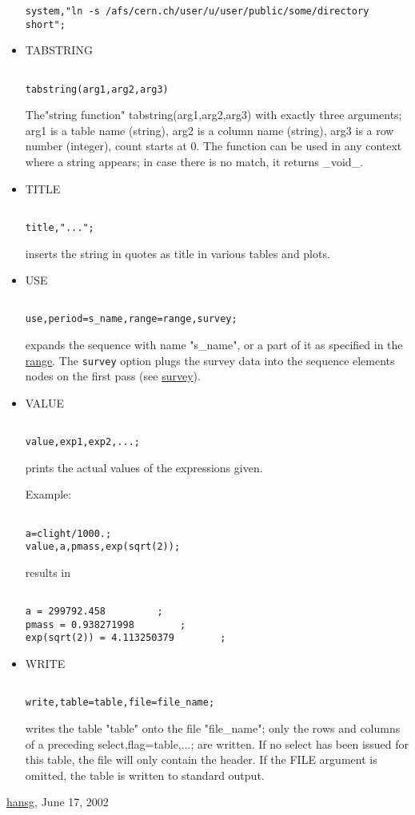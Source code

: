 \begin{itemize}
\begin{verbatim}
system,"ln -s /afs/cern.ch/user/u/user/public/some/directory short";
\end{verbatim}


	\item TABSTRING
\begin{verbatim}

tabstring(arg1,arg2,arg3)
\end{verbatim}  The"string function" tabstring(arg1,arg2,arg3) with exactly  three arguments; arg1 is a table name (string), arg2 is a column name  (string), arg3 is a row number (integer), count starts at 0. The function can be used in any context where a string appears; in case there is no match, it returns \_void\_. 


	\item TITLE
\begin{verbatim}

title,"...";
\end{verbatim} inserts the string in quotes as title in various tables and plots. 


	\item USE
\begin{verbatim}

use,period=s_name,range=range,survey;
\end{verbatim} expands the sequence with name "s\_name", or a part of it as specified in the \href{../Introduction/ranges.html#range}{range}. The \texttt{survey} option plugs the survey data into the sequence elements nodes on the first pass (see \href{../survey/survey.html}{survey}). 


	\item VALUE
\begin{verbatim}

value,exp1,exp2,...;
\end{verbatim} prints the actual values of the expressions given. 

 Example: 
\begin{verbatim}

a=clight/1000.;
value,a,pmass,exp(sqrt(2));
\end{verbatim} results in 
\begin{verbatim}

a = 299792.458         ;
pmass = 0.938271998        ;
exp(sqrt(2)) = 4.113250379        ;
\end{verbatim}


	\item WRITE
\begin{verbatim}

write,table=table,file=file_name;
\end{verbatim} writes the table "table" onto the file "file\_name"; only the rows and columns of a preceding select,flag=table,...; are written. If no select has been issued for this table, the file will only contain the header. If the FILE argument is omitted, the table is written to standard output. 
\end{itemize}

\href{http://www.cern.ch/Hans.Grote/hansg_sign.html}{hansg}, June 17, 2002 

